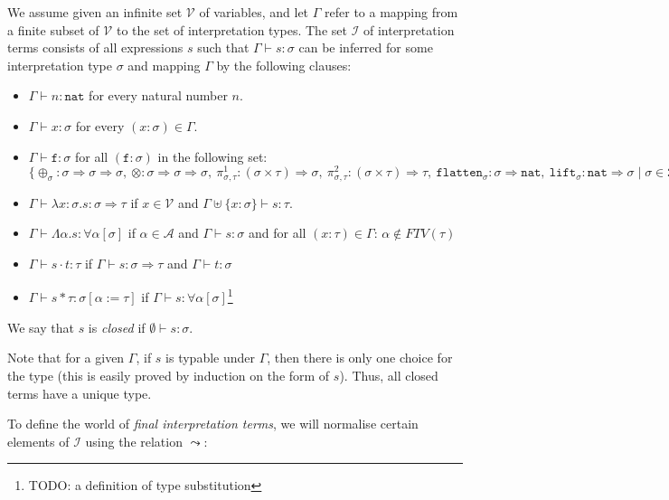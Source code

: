 \documentclass[runningheads,a4paper]{llncs}
\newcommand{\Iterms}{\mathcal{I}}
\newcommand{\Typevars}{\mathcal{A}}
\newcommand{\Vars}{\mathcal{V}}
\newcommand{\Types}{\mathcal{T}}
\newcommand{\quant}[2]{\forall #1[#2]}
\newcommand{\arrtype}{\Rightarrow}
\newcommand{\abs}[2]{\lambda #1.#2}
\newcommand{\tabs}[2]{\Lambda #1.#2}
\newcommand{\app}[2]{#1 \cdot #2}
\newcommand{\tapp}[2]{#1 * #2}
\newcommand{\subst}[2]{#1:=#2}
\newcommand{\FTV}{\mathit{FTV}}
\newcommand{\nat}{\mathtt{nat}}
\newcommand{\proj}{\pi}
\newcommand{\flatten}{\mathtt{flatten}}
\newcommand{\lift}{\mathtt{lift}}
\begin{document}
\begin{definition}
We assume given an infinite set $\Vars$ of variables, and let $\Gamma$
refer to a mapping from a finite subset of $\Vars$ to the set of
interpretation types.  The set $\Iterms$ of interpretation terms consists
of all expressions $s$ such that $\Gamma \vdash s : \sigma$ can be
inferred for some interpretation type $\sigma$ and mapping $\Gamma$ by
the following clauses:
\begin{itemize}
\item $\Gamma \vdash n : \nat$ for every natural number $n$.
\item $\Gamma \vdash x : \sigma$ for every $(x : \sigma) \in \Gamma$.
\item $\Gamma \vdash \mathtt{f} : \sigma$ for all $(\mathtt{f} :
  \sigma)$ in the following set: $\{ \oplus_\sigma : \sigma \arrtype
  \sigma \arrtype \sigma,\ \otimes : \sigma \arrtype \sigma \arrtype
  \sigma,\ \proj^1_{\sigma,\tau} : (\sigma \times \tau) \arrtype
  \sigma,\ \proj^2_{\sigma,\tau} : (\sigma \times \tau) \arrtype \tau,\ 
  \flatten_{\sigma} : \sigma \arrtype \nat,\ 
  \lift_{\sigma} : \nat \arrtype \sigma
  \mid \sigma \in \Types \}$
\item $\Gamma \vdash \abs{x:\sigma}{s} : \sigma \arrtype \tau$ if $x
  \in \Vars$ and $\Gamma \uplus \{ x : \sigma \} \vdash s : \tau$.
\item $\Gamma \vdash \tabs{\alpha}{s} : \quant{\alpha}{\sigma}$ if
  $\alpha \in \Typevars$ and $\Gamma \vdash s : \sigma$ and for all
  $(x : \tau) \in \Gamma$: $\alpha \notin \FTV(\tau)$
\item $\Gamma \vdash \app{s}{t} : \tau$ if $\Gamma \vdash s :
  \sigma \arrtype \tau$ and $\Gamma \vdash t : \sigma$
\item $\Gamma \vdash \tapp{s}{\tau} : \sigma[\subst{\alpha}{\tau}]$ if
  $\Gamma \vdash s : \quant{\alpha}{\sigma}$\footnote{TODO: a
  definition of type substitution}
\end{itemize}
We say that $s$ is \emph{closed} if $\emptyset \vdash s : \sigma$.
\end{definition}

Note that for a given $\Gamma$, if $s$ is typable under $\Gamma$, then
there is only one choice for the type (this is easily proved by
induction on the form of $s$).  Thus, all closed terms have a unique
type.

\medskip
To define the world of \emph{final interpretation terms}, we will
normalise certain elements of $\Iterms$ using the relation $\leadsto$:
\end{document}
